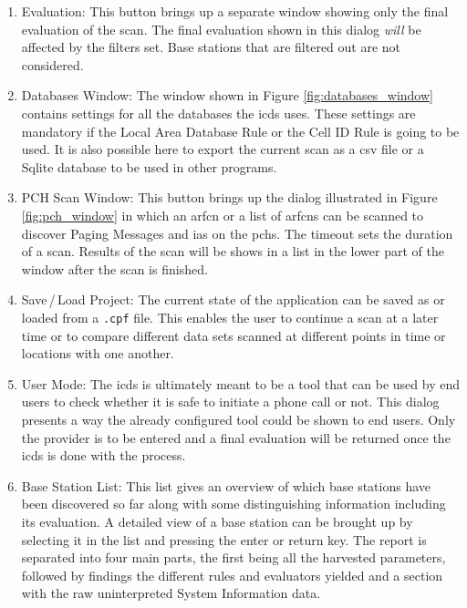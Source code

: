 \begin{enumerate}
\item Evaluation: This button brings up a separate window showing only the final evaluation of the scan.
The final evaluation shown in this dialog \emph{will} be affected by the filters set.
Base stations that are filtered out are not considered.

\item Databases Window: The window shown in Figure \ref{fig:databases_window} contains settings for all the databases the \gls{icds} uses.
These settings are mandatory if the Local Area Database Rule or the Cell ID Rule is going to be used.
It is also possible here to export the current scan as a \gls{csv} file or a Sqlite database to be used in other programs.

\item PCH Scan Window: This button brings up the dialog illustrated in Figure \ref{fig:pch_window} in which an \gls{arfcn} or a list of \glspl{arfcn} can be scanned to discover Paging Messages and \glspl{ia} on the \glspl{pch}.
The timeout sets the duration of a scan.
Results of the scan will be shows in a list in the lower part of the window after the scan is finished.

\item Save\,/\,Load Project: The current state of the application can be saved as or loaded from a \texttt{.cpf} file.
This enables the user to continue a scan at a later time or to compare different data sets scanned at different points in time or locations with one another.

\item User Mode: The \gls{icds} is ultimately meant to be a tool that can be used by end users to check whether it is safe to initiate a phone call or not.
This dialog presents a way the already configured tool could be shown to end users.
Only the provider is to be entered and a final evaluation will be returned once the \gls{icds} is done with the process.

\item Base Station List: This list gives an overview of which base stations have been discovered so far along with some distinguishing information including its evaluation.
A detailed view of a base station can be brought up by selecting it in the list and pressing the enter or return key.
The report is separated into four main parts, the first being all the harvested parameters, followed by findings the different rules and evaluators yielded and a section with the raw uninterpreted System Information data.
 

\end{enumerate}
